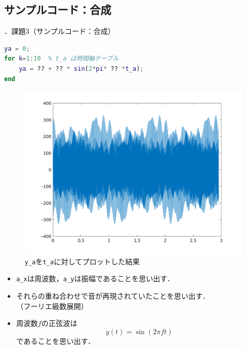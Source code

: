 \documentclass[aspectratio=43]{beamer}
\newcommand{\showsec}{\thesection ．}
\begin{document}
\subsection{サンプルコード：合成}
\begin{frame}[t,containsverbatim]{\showsec 課題3（サンプルコード：合成）}
    \begin{lstlisting}[language={Matlab},firstnumber={last}]
ya = 0;
for k=1:10  % t_a は時間軸テーブル
    ya = ?? + ?? * sin(2*pi* ?? *t_a);
end
\end{lstlisting}
    \begin{minipage}[t]{0.48\textwidth}
        \centering
        \begin{figure}
            \centering
            \caption{\scriptsize\texttt{y\_a}を\texttt{t\_a}に対してプロットした結果}
            \includegraphics[keepaspectratio,height=.45\textheight]{no3.png}
        \end{figure}
    \end{minipage}
    \begin{minipage}[t]{0.48\textwidth}
        \begin{itemize}
            \item \texttt{a\_x}は周波数，\texttt{a\_y}は振幅であることを思い出す．
            \item それらの重ね合わせで音が再現されていたことを思い出す．\\（フーリエ級数展開）
            \item 周波数\(f\)の正弦波は\[y(t)=\sin(2\pi ft)\]であることを思い出す．
        \end{itemize}
    \end{minipage}
\end{frame}
\end{document}
